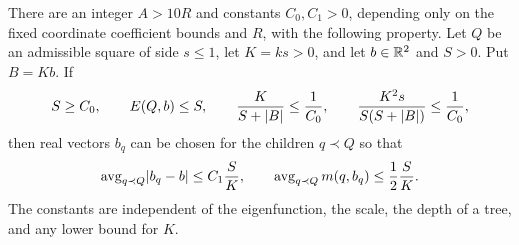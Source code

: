 \begin{proposition}
\label{prop:subdivision}
There are an integer \(A>10R\) and constants \(C_0,C_1>0\), depending
only on the fixed coordinate coefficient bounds and \(R\), with the
following property.  Let \(Q\) be an admissible square of side
\(s\le1\), let \(K=ks>0\), and let \(b\in\mathbb R^2\) and \(S>0\).
Put \(B=Kb\).  If
\begin{equation}
 S\ge C_0,\qquad E(Q,b)\le S,\qquad
 \frac{K}{S+\lvert B\rvert}\le\frac1{C_0},\qquad
 \frac{K^2s}{S(S+\lvert B\rvert)}\le\frac1{C_0},
\label{eq:subdivision-hypotheses}
\end{equation}
then real vectors \(b_q\) can be chosen for the children \(q\prec Q\)
so that
\begin{equation}
 \operatorname{avg}_{q\prec Q}\lvert b_q-b\rvert\le C_1\frac SK,
 \qquad
 \operatorname{avg}_{q\prec Q}m(q,b_q)\le\frac12\frac SK.
\label{eq:subdivision-estimate}
\end{equation}
The constants are independent of the eigenfunction, the scale,
the depth of a tree, and any lower bound for \(K\).
\end{proposition}


